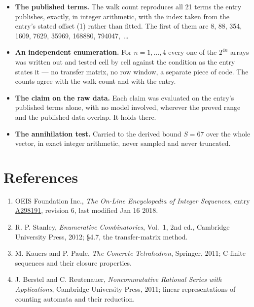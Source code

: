 \documentclass[11pt]{article}
\theoremstyle{definition}
\begin{document}
\begin{itemize}

\item {\bfseries The published terms.} The walk count reproduces all 21 terms the entry publishes, exactly, in integer arithmetic, with the index taken from the entry's stated offset (1) rather than fitted. The first of them are 8, 88, 354, 1609, 7629, 35969, 168880, 794047,~\dots

\item {\bfseries An independent enumeration.} For $n = 1,\dots,4$ every one of the $2^{4n}$ arrays was written out and tested cell by cell against the condition as the entry states it --- no transfer matrix, no row window, a separate piece of code. The counts agree with the walk count and with the entry.

\item {\bfseries The claim on the raw data.} Each claim was evaluated on the entry's published terms alone, with no model involved, wherever the proved range and the published data overlap. It holds there.

\item {\bfseries The annihilation test.} Carried to the derived bound $S = 67$ over the whole vector, in exact integer arithmetic, never sampled and never truncated.

\end{itemize}

\section{References}

\begin{enumerate}

\item OEIS Foundation Inc., \emph{The On-Line Encyclopedia of Integer Sequences}, entry \href{https://oeis.org/A298191}{A298191}, revision 6, last modified Jan 16 2018.

\item R. P. Stanley, \emph{Enumerative Combinatorics}, Vol.~1, 2nd ed., Cambridge University Press, 2012; \S4.7, the transfer-matrix method.

\item M. Kauers and P. Paule, \emph{The Concrete Tetrahedron}, Springer, 2011; C-finite sequences and their closure properties.

\item J. Berstel and C. Reutenauer, \emph{Noncommutative Rational Series with Applications}, Cambridge University Press, 2011; linear representations of counting automata and their reduction.

\end{enumerate}
\end{document}
